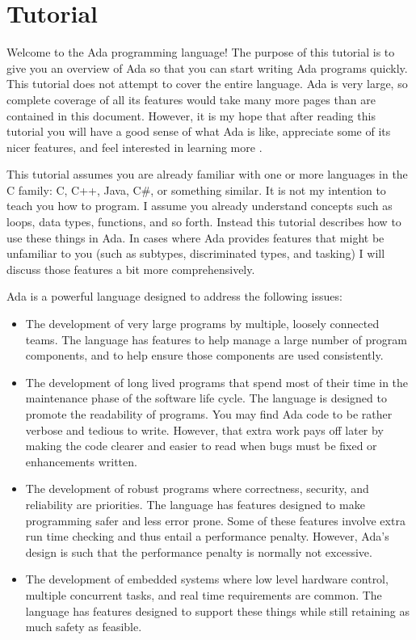 
\chapter{Tutorial}
\label{chapt:tutorial}

Welcome to the Ada programming language! The purpose of this tutorial is to give you an overview
of Ada so that you can start writing Ada programs quickly. This tutorial does not attempt to
cover the entire language. Ada is very large, so complete coverage of all its features would
take many more pages than are contained in this document. However, it is my hope that after
reading this tutorial you will have a good sense of what Ada is like, appreciate some of its
nicer features, and feel interested in learning more
\cite{Barnes2014,McCormick2011,Ben-Ari2009,Burns2007,Dale2007}.

This tutorial assumes you are already familiar with one or more languages in the C family: C,
C++, Java, C\#, or something similar. It is not my intention to teach you how to program. I
assume you already understand concepts such as loops, data types, functions, and so forth.
Instead this tutorial describes how to use these things in Ada. In cases where Ada provides
features that might be unfamiliar to you (such as subtypes, discriminated types, and tasking) I
will discuss those features a bit more comprehensively.

Ada is a powerful language designed to address the following issues:

\begin{itemize}
\item The development of very large programs by multiple, loosely connected teams. The language
  has features to help manage a large number of program components, and to help ensure those
  components are used consistently.

\item The development of long lived programs that spend most of their time in the maintenance
  phase of the software life cycle. The language is designed to promote the readability of
  programs. You may find Ada code to be rather verbose and tedious to write. However, that extra
  work pays off later by making the code clearer and easier to read when bugs must be fixed or
  enhancements written.

\item The development of robust programs where correctness, security, and reliability are
  priorities. The language has features designed to make programming safer and less error prone.
  Some of these features involve extra run time checking and thus entail a performance penalty.
  However, Ada's design is such that the performance penalty is normally not excessive.

\item The development of embedded systems where low level hardware control, multiple concurrent
  tasks, and real time requirements are common. The language has features designed to support
  these things while still retaining as much safety as feasible.
\end{itemize}

